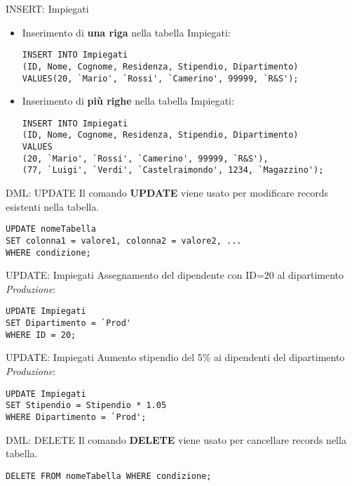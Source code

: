 \begin{frame}[fragile]{INSERT: Impiegati}
\begin{itemize}
\item Inserimento di \textbf{una riga} nella tabella Impiegati:
\begin{lstlisting}
INSERT INTO Impiegati
(ID, Nome, Cognome, Residenza, Stipendio, Dipartimento)
VALUES(20, `Mario', `Rossi', `Camerino', 99999, `R&S');
\end{lstlisting}
\item Inserimento di \textbf{pi\`u righe} nella tabella Impiegati:
\begin{lstlisting}
INSERT INTO Impiegati
(ID, Nome, Cognome, Residenza, Stipendio, Dipartimento)
VALUES
(20, `Mario', `Rossi', `Camerino', 99999, `R&S'),
(77, `Luigi', `Verdi', `Castelraimondo', 1234, `Magazzino');
\end{lstlisting}
\end{itemize}
\end{frame}
%
\begin{frame}[fragile]{DML: UPDATE}
Il comando \textbf{UPDATE} viene usato per modificare records esistenti nella tabella.

\begin{lstlisting}
UPDATE nomeTabella
SET colonna1 = valore1, colonna2 = valore2, ...
WHERE condizione;
\end{lstlisting}
\end{frame}
%
\begin{frame}[fragile]{UPDATE: Impiegati}
Assegnamento del dipendente con ID=20 al dipartimento \textit{Produzione}:
\pause
\begin{lstlisting}
UPDATE Impiegati
SET Dipartimento = `Prod'
WHERE ID = 20;
\end{lstlisting}
\end{frame}
%
\begin{frame}[fragile]{UPDATE: Impiegati}
Aumento stipendio del 5\% ai dipendenti del dipartimento \textit{Produzione}:
\pause
\begin{lstlisting}
UPDATE Impiegati
SET Stipendio = Stipendio * 1.05
WHERE Dipartimento = `Prod';
\end{lstlisting}
\end{frame}
%
\begin{frame}[fragile]{DML: DELETE}
Il comando \textbf{DELETE} viene usato per cancellare records nella tabella.

\begin{lstlisting}
DELETE FROM nomeTabella WHERE condizione;
\end{lstlisting}
\end{frame}
